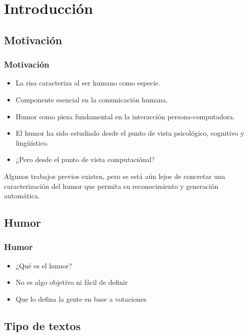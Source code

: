\section{Introducción} 

\subsection{Motivación}

\begin{frame}[allowframebreaks]
    \frametitle{Motivación}

    \begin{itemize}
        \item La risa caracteriza al ser humano como especie.
        \item Componente esencial en la comunicación humana.
        \item Humor como pieza fundamental en la interacción persona-computadora.
    \end{itemize}

    \framebreak
    
    \begin{itemize}
        \item El humor ha sido estudiado desde el punto de vista psicológico, cognitivo y lingüístico.
        \item ¿Pero desde el punto de vista computaciónal?
    \end{itemize}
    Algunos trabajos previos existen, pero se está aún lejos de concretar una caracterización del humor que permita su reconocimiento y generación automática.
\end{frame}

\subsection{Humor}

\begin{frame}
    \frametitle{Humor}

    \begin{itemize}[<+->]
        \item ¿Qué es el humor?
        \item No es algo objetivo ni fácil de definir
        \item Que lo defina la gente en base a votaciones
    \end{itemize}
\end{frame}

\subsection{Tipo de textos}

